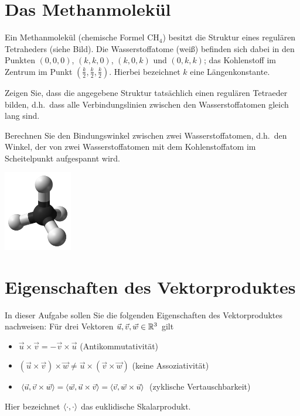 \documentclass{scrartcl}
\begin{document}
\maketitle


\section{Das Methanmolekül }
Ein Methanmolekül (chemische Formel $\mathrm{CH}_4$) besitzt die Struktur eines regulären Tetraheders (siehe Bild).
Die Wasserstoffatome (weiß) befinden sich dabei in den Punkten $(0,0,0)$, $(k,k,0)$, $(k,0,k)$ und $(0,k,k)$; das Kohlenstoff im Zentrum im Punkt $(\frac{k}{2},\frac{k}{2},\frac{k}{2})$.
Hierbei bezeichnet $k$ eine Längenkonstante.
\begin{subex}
  \item Zeigen Sie, dass die angegebene Struktur tatsächlich einen regulären Tetraeder bilden, d.h.\ dass alle Verbindungslinien zwischen den Wasserstoffatomen gleich lang sind.
  \item Berechnen Sie den Bindungswinkel zwischen zwei Wasserstoffatomen, d.h.\ den Winkel, der von zwei Wasserstoffatomen mit dem Kohlenstoffatom im Scheitelpunkt aufgespannt wird.
\end{subex}

\begin{center}
  \includegraphics[width=3cm]{img/methan.png}
\end{center}


\section{Eigenschaften des Vektorproduktes }
In dieser Aufgabe sollen Sie die folgenden Eigenschaften des Vektorproduktes nachweisen:
Für drei Vektoren $\vec{u},\vec{v},\vec{w} \in \RR^3$ gilt
\begin{itemize}
  \item $\vec{u} \times \vec{v} = - \vec{v} \times \vec{u}$ (Antikommutativität)
  \item $(\vec{u} \times \vec{v}) \times \vec{w} \neq \vec{u} \times (\vec{v} \times \vec{w})$ (keine Assoziativität)
  \item $\sp{\vec{u}}{\vec{v} \times \vec{w}} = \sp{\vec{w}}{ \vec{u} \times \vec{v}} = \sp{\vec{v}}{ \vec{w} \times \vec{u}}$ (zyklische Vertauschbarkeit)
\end{itemize}
Hier bezeichnet $\sp{\cdot}{\cdot}$ das euklidische Skalarprodukt.
\end{document}
